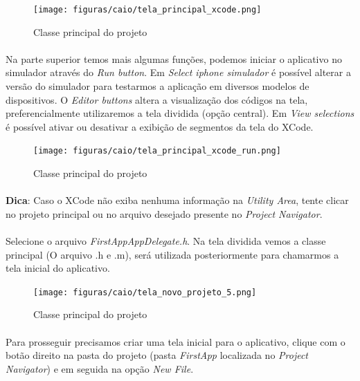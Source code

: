 \documentclass[a4paper,12pt,brazil,doubleside]{book}
\begin{document}
\begin{singlespace}
\begin{figure}[H]
  \centering
  \texttt{[image: figuras/caio/tela\_principal\_xcode.png]}
  \caption{Classe principal do projeto}
  \label{fig:a}
\end{figure}

\paragraph{}Na parte superior temos mais algumas funções, podemos iniciar o aplicativo no simulador através do \emph{Run button}. Em \emph{Select iphone simulador} é possível alterar a versão do simulador para testarmos a aplicação em diversos modelos de dispositivos. O \emph{Editor buttons} altera a visualização dos códigos na tela, preferencialmente utilizaremos a tela dividida (opção central). Em \emph{View selections} é possível ativar ou desativar a exibição de segmentos da tela do XCode.

\begin{figure}[H]
  \centering
  \texttt{[image: figuras/caio/tela\_principal\_xcode\_run.png]}
  \caption{Classe principal do projeto}
  \label{fig:a}
\end{figure}

\begin{framed}
\paragraph{}\textbf{Dica}: Caso o XCode não exiba nenhuma informação na
\textit{Utility Area}, tente clicar no projeto principal ou no arquivo desejado presente no \textit{Project Navigator}.
\end{framed}

\paragraph{} Selecione o arquivo \emph{FirstAppAppDelegate.h}. Na tela dividida vemos a classe principal (O arquivo .h e .m), será utilizada posteriormente para chamarmos a tela inicial do aplicativo.

\begin{figure}[H]
  \centering
  \texttt{[image: figuras/caio/tela\_novo\_projeto\_5.png]}
  \caption{Classe principal do projeto}
  \label{fig:a}
\end{figure}

\paragraph{}Para prosseguir precisamos criar uma tela inicial para o aplicativo, clique com o botão direito na pasta do projeto (pasta \emph{FirstApp} localizada no \emph{Project Navigator}) e em seguida na opção \emph{New File}.


\end{singlespace}
\end{document}
